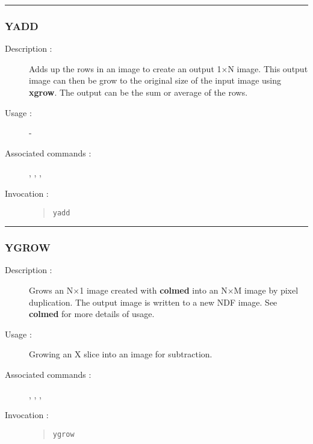 \hrule
\subsubsection*{\label{YADD}YADD}

\begin{description}

\item[Description :] Adds up the rows in an image to create an output
1$\times$N image.  This output image can then be grow to the original
size of the input image using {\bf xgrow}.  The output can be the sum or
average of the rows.

\item[Usage :] -

\item[Associated commands :] {\tt {}},
{\tt {}}, {\tt {}},
{\tt {}}

\item[Invocation :]

\begin{quote}{\tt  yadd }\end{quote}

\end{description}

\hrule
\subsubsection*{\label{YGROW}YGROW}

\begin{description}

\item[Description :] Grows an N$\times$1 image created with {\bf colmed}
into an N$\times$M image by pixel duplication.  The output
image is written to a new NDF image.  See {\bf colmed} for more details of
usage.

\item[Usage :] Growing an X slice into an image for subtraction.

\item[Associated commands :] {\tt {}},
{\tt {}}, {\tt {}},
{\tt {}}

\item[Invocation :]

\begin{quote}{\tt  ygrow }\end{quote}

\end{description}

